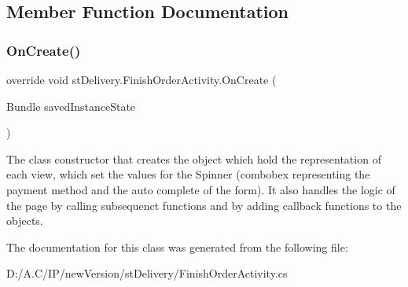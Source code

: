 \subsection{Member Function Documentation}
\mbox{\label{classst_delivery_1_1_finish_order_activity_a5d64dbe6554f46e12556f93c38b365f8}} 
\subsubsection{\texorpdfstring{On\+Create()}{OnCreate()}}
{\footnotesize\ttfamily override void st\+Delivery.\+Finish\+Order\+Activity.\+On\+Create (\begin{DoxyParamCaption}\item[{Bundle}]{saved\+Instance\+State }\end{DoxyParamCaption})\hspace{0.3cm}{\ttfamily [protected]}}



The class constructor that creates the object which hold the representation of each view, which set the values for the Spinner (combobex representing the payment method and the auto complete of the form). It also handles the logic of the page by calling subsequenct functions and by adding callback functions to the objects. 



The documentation for this class was generated from the following file\+:\begin{DoxyCompactItemize}
\item 
D\+:/\+A.\+C/\+I\+P/new\+Version/st\+Delivery/Finish\+Order\+Activity.\+cs\end{DoxyCompactItemize}
